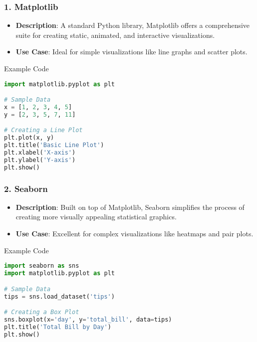 \documentclass[aspectratio=169]{beamer}
\begin{document}
\begin{frame}[fragile]
    \frametitle{1. Matplotlib}
    \begin{itemize}
        \item \textbf{Description}: A standard Python library, Matplotlib offers a comprehensive suite for creating static, animated, and interactive visualizations.
        \item \textbf{Use Case}: Ideal for simple visualizations like line graphs and scatter plots.
    \end{itemize}
    \begin{block}{Example Code}
        \begin{lstlisting}[language=Python]
import matplotlib.pyplot as plt

# Sample Data
x = [1, 2, 3, 4, 5]
y = [2, 3, 5, 7, 11]

# Creating a Line Plot
plt.plot(x, y)
plt.title('Basic Line Plot')
plt.xlabel('X-axis')
plt.ylabel('Y-axis')
plt.show()
        \end{lstlisting}
    \end{block}
\end{frame}

\begin{frame}[fragile]
    \frametitle{2. Seaborn}
    \begin{itemize}
        \item \textbf{Description}: Built on top of Matplotlib, Seaborn simplifies the process of creating more visually appealing statistical graphics.
        \item \textbf{Use Case}: Excellent for complex visualizations like heatmaps and pair plots.
    \end{itemize}
    \begin{block}{Example Code}
        \begin{lstlisting}[language=Python]
import seaborn as sns
import matplotlib.pyplot as plt

# Sample Data
tips = sns.load_dataset('tips')

# Creating a Box Plot
sns.boxplot(x='day', y='total_bill', data=tips)
plt.title('Total Bill by Day')
plt.show()
        \end{lstlisting}
    \end{block}
\end{frame}
\end{document}
